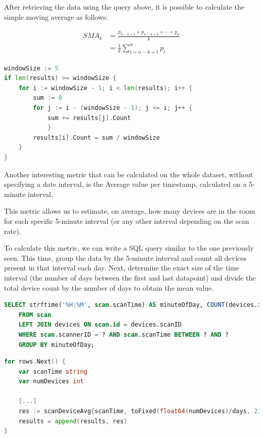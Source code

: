 \documentclass[a4paper, 11pt]{article}
\begin{document}
After retrieving the data using the query above, it is possible to calculate the simple moving average as follows:

\begin{equation}
	{\displaystyle {\begin{aligned}{\textit {SMA}}_{k}&={\frac {p_{n-k+1}+p_{n-k+2}+\cdots +p_{n}}{k}}\\&={\frac {1}{k}}\sum _{i=n-k+1}^{n}p_{i}\end{aligned}}}
\end{equation}


\begin{lstlisting}[language=Go]
windowSize := 5
if len(results) >= windowSize {
	for i := windowSize - 1; i < len(results); i++ {
		sum := 0
		for j := i - (windowSize - 1); j <= i; j++ {
			sum += results[j].Count
			}
		results[i].Count = sum / windowSize
	}
}
\end{lstlisting}

Another interesting metric that can be calculated on the whole dataset, without specifying a date interval, is the Average value per timestamp, calculated on a 5-minute interval.

This metric allows us to estimate, on average, how many devices are in the room for each specific 5-minute interval (or any other interval depending on the scan rate).

To calculate this metric, we can write a SQL query similar to the one previously seen. This time, group the data by the 5-minute interval and count all devices present in that interval each day. Next, determine the exact size of the time interval (the number of days between the first and last datapoint) and divide the total device count by the number of days to obtain the mean value.

\begin{lstlisting}[language=SQL]
	SELECT strftime('%H:%M', scan.scanTime) AS minuteOfDay, COUNT(devices.id) AS averageValue
	FROM scan
	LEFT JOIN devices ON scan.id = devices.scanID
	WHERE scan.scannerID = ? AND scan.scanTime BETWEEN ? AND ?
	GROUP BY minuteOfDay;
\end{lstlisting}

\begin{lstlisting}[language=Go]
for rows.Next() {
	var scanTime string
	var numDevices int

	[...]
	res := scanDeviceAvg{scanTime, toFixed(float64(numDevices)/days, 2)}
	results = append(results, res)
}
\end{lstlisting}
\end{document}
